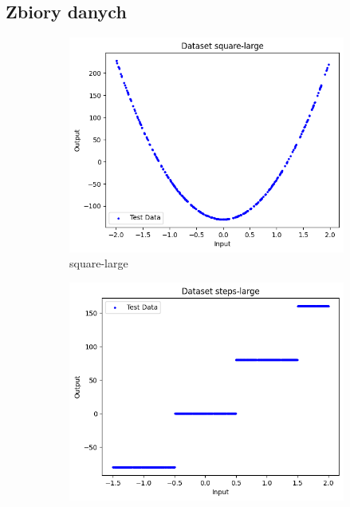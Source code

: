 \documentclass{article}
\begin{document}
\subsection*{Zbiory danych}
\begin{figure}[H]
    \centering
    \begin{subfigure}[b]{0.3\textwidth}
        \centering
        \includegraphics[width=\textwidth]{img/nn3/square-large.png}
        \caption{square-large}
    \end{subfigure}
    \hfill
    \begin{subfigure}[b]{0.3\textwidth}
        \centering
        \includegraphics[width=\textwidth]{img/nn3/steps-large.png}

\end{subfigure}
\end{figure}
\end{document}
